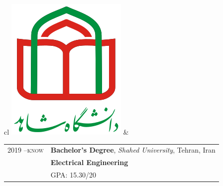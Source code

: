 
\begin{tabular}{cl}
	\includegraphics[scale=0.15]{graphics/Shahed_logo}        &
	\begin{tabular}{rl}
		\textsc{2019 --know} & \textbf{Bachelor's Degree},  \emph{Shahed University}, Tehran, Iran                                          \\
		                     & \textbf{Electrical Engineering}                                                                                     \\
		                     & \textsc{GPA}: 15.30/20                                                                                                      \\
	\end{tabular}
	\\
\end{tabular}
\\

